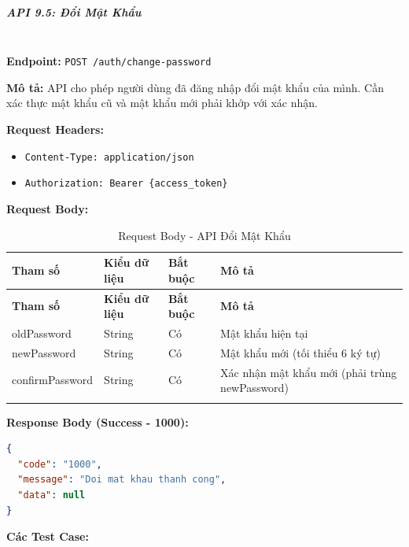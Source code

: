 \normalsize

\subparagraph{API 9.5: Đổi Mật Khẩu}~\\

\textbf{Endpoint:} \texttt{POST /auth/change-password}

\textbf{Mô tả:} API cho phép người dùng đã đăng nhập đổi mật khẩu của mình. Cần xác thực mật khẩu cũ và mật khẩu mới phải khớp với xác nhận.

\textbf{Request Headers:}
\begin{itemize}
    \item \texttt{Content-Type: application/json}
    \item \texttt{Authorization: Bearer \{access\_token\}}
\end{itemize}

\textbf{Request Body:}

\small
\begin{longtable}{|>{\raggedright\arraybackslash}p{3.5cm}|>{\raggedright\arraybackslash}p{2.5cm}|>{\raggedright\arraybackslash}p{2cm}|>{\raggedright\arraybackslash}p{5.5cm}|}
\hline
\textbf{Tham số} & \textbf{Kiểu dữ liệu} & \textbf{Bắt buộc} & \textbf{Mô tả} \\
\hline
\endfirsthead
\hline
\textbf{Tham số} & \textbf{Kiểu dữ liệu} & \textbf{Bắt buộc} & \textbf{Mô tả} \\
\hline
\endhead
oldPassword & String & Có & Mật khẩu hiện tại \\
\hline
newPassword & String & Có & Mật khẩu mới (tối thiểu 6 ký tự) \\
\hline
confirmPassword & String & Có & Xác nhận mật khẩu mới (phải trùng newPassword) \\
\hline
\caption{Request Body - API Đổi Mật Khẩu}
\end{longtable}

\textbf{Response Body (Success - 1000):}

\begin{lstlisting}[language=json, caption=Response thanh cong API 9.5]
{
  "code": "1000",
  "message": "Doi mat khau thanh cong",
  "data": null
}
\end{lstlisting}

\textbf{Các Test Case:}

